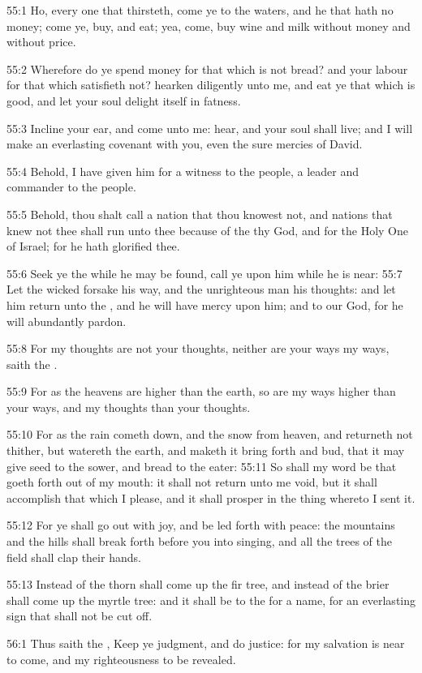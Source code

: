 55:1 Ho, every one that thirsteth, come ye to the waters, and he that
hath no money; come ye, buy, and eat; yea, come, buy wine and milk
without money and without price.

55:2 Wherefore do ye spend money for that which is not bread? and your
labour for that which satisfieth not? hearken diligently unto me, and
eat ye that which is good, and let your soul delight itself in
fatness.

55:3 Incline your ear, and come unto me: hear, and your soul shall
live; and I will make an everlasting covenant with you, even the sure
mercies of David.

55:4 Behold, I have given him for a witness to the people, a leader
and commander to the people.

55:5 Behold, thou shalt call a nation that thou knowest not, and
nations that knew not thee shall run unto thee because of the \LORD thy
God, and for the Holy One of Israel; for he hath glorified thee.

55:6 Seek ye the \LORD while he may be found, call ye upon him while he
is near: 55:7 Let the wicked forsake his way, and the unrighteous man
his thoughts: and let him return unto the \LORD, and he will have mercy
upon him; and to our God, for he will abundantly pardon.

55:8 For my thoughts are not your thoughts, neither are your ways my
ways, saith the \LORD.

55:9 For as the heavens are higher than the earth, so are my ways
higher than your ways, and my thoughts than your thoughts.

55:10 For as the rain cometh down, and the snow from heaven, and
returneth not thither, but watereth the earth, and maketh it bring
forth and bud, that it may give seed to the sower, and bread to the
eater: 55:11 So shall my word be that goeth forth out of my mouth: it
shall not return unto me void, but it shall accomplish that which I
please, and it shall prosper in the thing whereto I sent it.

55:12 For ye shall go out with joy, and be led forth with peace: the
mountains and the hills shall break forth before you into singing, and
all the trees of the field shall clap their hands.

55:13 Instead of the thorn shall come up the fir tree, and instead of
the brier shall come up the myrtle tree: and it shall be to the \LORD
for a name, for an everlasting sign that shall not be cut off.

56:1 Thus saith the \LORD, Keep ye judgment, and do justice: for my
salvation is near to come, and my righteousness to be revealed.

